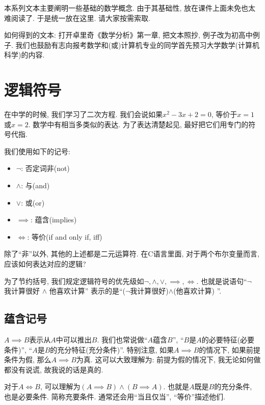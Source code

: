 \documentclass{ctexart}
\begin{document}
本系列文本主要阐明一些基础的数学概念. 由于其基础性, 放在课件上面未免也太难阅读了. 于是统一放在这里. 请大家按需索取. 

如何得到的文本: 打开卓里奇《数学分析》第一章, 把文本照抄, 例子改为初高中例子. 我们也鼓励有志向报考数学和(或)计算机专业的同学首先预习大学数学(计算机科学)的内容.

\section{逻辑符号}

在中学的时候, 我们学习了二次方程. 我们会说如果$x^2-3x+2=0$, 等价于$x=1$或$x=2$. 数学中有相当多类似的表达. 为了表达清楚起见, 最好把它们用专门的符号代指. 

我们使用如下的记号: 

\begin{itemize}
    \item $\lnot$: 否定词非(not)
    \item $\land$: 与(and)
    \item $\lor$: 或(or)
    \item $\implies$: 蕴含(implies)
    \item $\iff$: 等价(if and only if, iff)
\end{itemize}

\begin{chk}

    除了``非''以外, 其他的上述都是二元运算符. 在C语言里面, 对于两个布尔变量而言, 应该如何表达对应的逻辑?

\end{chk}

为了节约括号, 我们规定逻辑符号的优先级如$\lnot, \land, \lor, \implies, \iff$. 也就是说语句``$\lnot$ 我计算很好 $\land$ 他喜欢计算''
表示的是``($\lnot$我计算很好)$\land$(他喜欢计算) ''. 


\subsection{蕴含记号} $A\implies B $表示从$A$中可以推出$B$. 我们也常说做``$A$蕴含$B$'', ``$B$是$A$的必要特征(必要条件)'', ``$A$是$B$的充分特征(充分条件)''. 特别注意, 如果$A\implies B$的情况下, 如果前提条件为假, 那么$A \implies B$为真. 这可以大致理解为: 前提为假的情况下, 我无论如何做都没有说谎, 故我说的话是真的.  

对于$A \iff B$, 可以理解为$(A\implies B) \land (B\implies A)$. 也就是$A$既是$B$的充分条件, 也是必要条件. 简称充要条件. 通常还会用``当且仅当'', ``等价''描述他们. 
\end{document}
